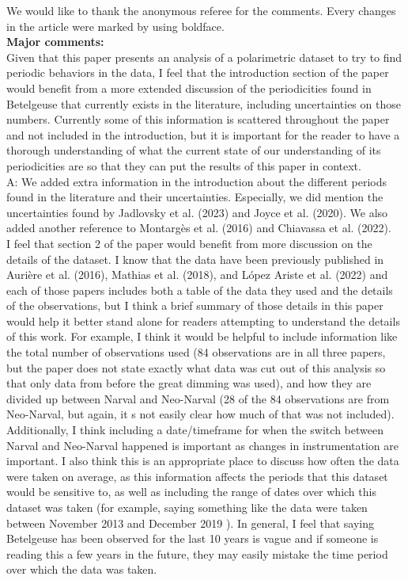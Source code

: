 \documentclass{article}
\begin{document}
We would like to thank the anonymous referee for the comments. Every changes in the article were marked by using boldface. \\

\textbf{Major comments:}\\

Given that this paper presents an analysis of a polarimetric dataset to try to find periodic
behaviors in the data, I feel that the introduction section of the paper would benefit from a more
extended discussion of the periodicities found in Betelgeuse that currently exists in the
literature, including uncertainties on those numbers. Currently some of this information is
scattered throughout the paper and not included in the introduction, but it is important for the
reader to have a thorough understanding of what the current state of our understanding of its
periodicities are so that they can put the results of this paper in context.\\

A: We added extra information in the introduction about the different periods found in the literature and their uncertainties. Especially, we did mention the uncertainties found by Jadlovsky et al. (2023) and Joyce et al. (2020). We also added another reference to Montargès et al. (2016) and Chiavassa et al. (2022).\\

I feel that section 2 of the paper would benefit from more discussion on the details of the
dataset. I know that the data have been previously published in Aurière et al. (2016), Mathias et
al. (2018), and López Ariste et al. (2022) and each of those papers includes both a table of the
data they used and the details of the observations, but I think a brief summary of those details in
this paper would help it better stand alone for readers attempting to understand the details of
this work. For example, I think it would be helpful to include information like the total number of
observations used (84 observations are in all three papers, but the paper does not state exactly
what data was cut out of this analysis so that only data from before the great dimming was
used), and how they are divided up between Narval and Neo-Narval (28 of the 84 observations
are from Neo-Narval, but again, it s not easily clear how much of that was not included).
Additionally, I think including a date/timeframe for when the switch between Narval and
Neo-Narval happened is important as changes in instrumentation are important. I also think this
is an appropriate place to discuss how often the data were taken on average, as this information
affects the periods that this dataset would be sensitive to, as well as including the range of dates
over which this dataset was taken (for example, saying something like the data were taken
between November 2013 and December 2019 ). In general, I feel that saying Betelgeuse has
been observed for the last 10 years is vague and if someone is reading this a few years in the
future, they may easily mistake the time period over which the data was taken.\\
\end{document}
